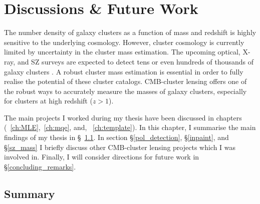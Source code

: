 \chapter{Discussions \& Future Work}
The number density of galaxy clusters as a function of mass and redshift is highly sensitive to the underlying cosmology. However, cluster cosmology is currently limited by uncertainty in the cluster mass estimation. The upcoming optical, X-ray, and SZ surveys are expected to detect tens or even hundreds of thousands of galaxy clusters \citep{lsst09, cmbs4-sb1,erosita12,euclid10}. A robust cluster mass estimation is essential in order to fully realise the potential of these cluster catalogs.  CMB-cluster lensing offers one of the robust ways to accurately measure the masses of galaxy clusters, especially for clusters at high redshift ($z  > 1$). 

The main projects I worked during my thesis have been discussed in chapters (~\ref{ch:MLE},~\ref{ch:mqe}, and, ~\ref{ch:template}). 
In this chapter, I summarise the main findings of my thesis in \S~\ref{sum}. 
 In section \S\ref{pol_detection}, \S\ref{inpaint}, and \S\ref{sz_mass} I briefly discuss other CMB-cluster lensing projects which I was involved in. 
Finally, I will consider directions for future work in \S\ref{concluding_remarks}.

\section{Summary}
\label{sum}

